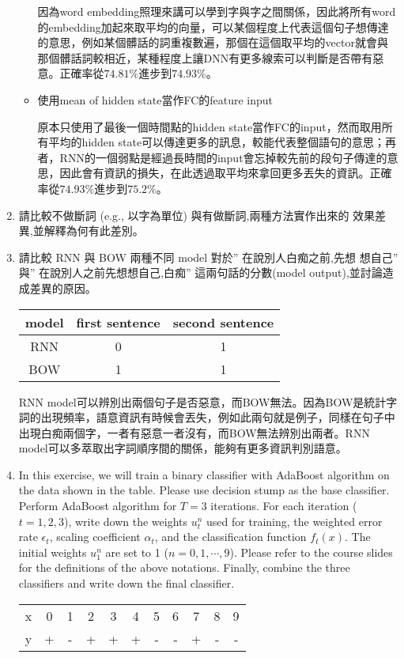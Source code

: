 \documentclass[12pt, a4paper]{article}
\begin{document}
\begin{enumerate}
\begin{itemize}
    因為word embedding照理來講可以學到字與字之間關係，因此將所有word的embedding加起來取平均的向量，可以某個程度上代表這個句子想傳達的意思，例如某個髒話的詞重複數遍，那個在這個取平均的vector就會與那個髒話詞較相近，某種程度上讓DNN有更多線索可以判斷是否帶有惡意。正確率從$74.81\%$進步到$74.93\%$。
    \item 使用mean of hidden state當作FC的feature input\par
    原本只使用了最後一個時間點的hidden state當作FC的input，然而取用所有平均的hidden state可以傳達更多的訊息，較能代表整個語句的意思；再者，RNN的一個弱點是經過長時間的input會忘掉較先前的段句子傳達的意思，因此會有資訊的損失，在此透過取平均來拿回更多丟失的資訊。正確率從$74.93\%$進步到$75.2\%$。
\end{itemize}
\item 請比較不做斷詞 (e.g., 以字為單位) 與有做斷詞,兩種方法實作出來的
效果差異,並解釋為何有此差別。\par

\item 請比較 RNN 與 BOW 兩種不同 model 對於” 在說別人白痴之前,先想
想自己” 與” 在說別人之前先想想自己,白痴” 這兩句話的分數(model output),並討論造成差異的原因。\par
\begin{table}[H]
    \centering
    \begin{tabular}{|c|c|c|}\hline
        model&first sentence&second sentence\\\hline
        RNN&0&1\\ \hline
        BOW&1&1\\ \hline
    \end{tabular}
\end{table}
RNN model可以辨別出兩個句子是否惡意，而BOW無法。因為BOW是統計字詞的出現頻率，語意資訊有時候會丟失，例如此兩句就是例子，同樣在句子中出現白痴兩個字，一者有惡意一者沒有，而BOW無法辨別出兩者。RNN model可以多萃取出字詞順序間的關係，能夠有更多資訊判別語意。

\item In this exercise, we will train a binary classifier with AdaBoost algorithm
on the data shown in the table. Please use decision stump as the base classifier. Perform
AdaBoost algorithm for $T = 3$ iterations. For each iteration ($t = 1, 2, 3$), write down
the weights $u^n_t$ used for training, the weighted error rate $\epsilon_t$, scaling coefficient $\alpha_t$, and the classification function $f_t(x)$. The initial weights $u^n_1$ are set to 1 ($n = 0, 1, \cdots, 9$). Please refer to the course slides for the definitions of the above notations. Finally, combine the three classifiers and write down the final classifier.
\begin{table}[H]
    \centering
    \begin{tabular}{c|cccccccccc}\hline
        x&0&1&2&3&4&5&6&7&8&9\\
        y&+&-&+&+&+&-&-&+&-&-\\ \hline
    \end{tabular}
\end{table}


\end{enumerate}
\end{document}
